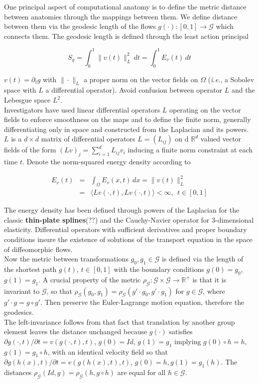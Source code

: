 \documentclass[final, paper=letter,5p,times,twocolumn]{elsarticle}
\newcommand{\CA}{computational anatomy}
\theoremstyle{definition}
\begin{document}
One principal aspect of \CA{} is to define the metric distance between anatomies through the mappings between them. We define distance between them via the geodesic length of the flows $g(\cdot): [0, 1] \rightarrow \mathcal{G}$ which connects them. The geodesic length is defined through the least action principal 

$$
S_{g} = \int_{0}^{1} \|v(t)\|_{L}^{2} \,dt = \int_{0}^{1} E_{v}(t) \,dt
$$ 

$v(t) = \partial_{t} g$ with $\| \cdot \|_{L}$ a proper norm on the vector fields on $\Omega$ ({\it i.e.}, a Sobolev space with $L$ a differential operator). Avoid confusion between operator $L$ and the Lebesgue space $L^{2}$.\\

Investigators have used linear differential operators $L$ operating on the vector fields to enforce smoothness on the maps and to define the finite norm, generally differentiating only in space and constructed from the Laplacian and its powers. $L$ is a $d \times d$ matrix of differential operators $L = (L_{ij})$ on d $\mathbb{R}^{d}$ valued vector fields of the form $(Lv)_{j} = \sum_{i = 1}^{d} L_{ij}v_{i}$ inducing a finite norm constraint at each time $t$. Denote the norm-squared energy density according to 

\begin{eqnarray*}
  E_{v}(t) & = & \int_{\Omega}E_{v}(x,t) \, dx = \| v(t)\|_{L}^{2} \\
  & = & \langle Lv(\cdot, t), Lv(\cdot, t) \rangle < \infty, ~~t \in [0,1]
\label{EnergyDensity}
\end{eqnarray*}

The energy density has been defined through powers of the Laplacian for the classic {\bf thin-plate splines}(??) and the Cauchy-Navier operator for 3-dimensional elasticity. Differential operators with sufficient derivatives and proper boundary conditions insure the existence of solutions of the transport equation in the space of diffeomorphic flows.\\

Now the metric between transformations $g_{0}, g_{1} \in \mathcal{G}$ is defined via the length of the shortest path $g(t)$, $t \in [0, 1]$ with the boundary conditions $g(0) = g_{0}$, $g(1) = g_{1}$. A crucial property of the metric $\rho_{\mathcal{G}}: \mathcal{G} \times \mathcal{G} \rightarrow \mathbb{R}^{+}$ is that it is invariant to $\mathcal{G}$, so that $\rho_{\mathcal{G}}(g_{0}, g_{1}) = \rho_{\mathcal{G}}(g' \cdot g_{0}, g' \cdot g_{1})$ for $g \in \mathcal{G}$, where $g' \cdot g = g \circ g'$. Then preserve the Euler-Lagrange motion equation, therefore the geodesics.\\
The left-invariance follows from that fact that translation by another group element leaves the distance unchanged because $g(\cdot)$ satisfies $\partial g(\cdot, t) / \partial t = v(g(\cdot, t), t)$, $g(0) = Id$, $g(1) = g_{1}$ implying $g(0) \circ h = h$, $g(1) = g_{1} \circ h$, with an identical velocity field so that $\partial g(h(x),t)/\partial t = v(g(h(x),t),t)$, $g(0) = h, g(1) = g_{1}(h)$. The distances $\rho_{\mathcal{G}}(Id, g) = \rho_{\mathcal{G}}(h, g \circ h)$ are equal for all $h \in \mathcal{G}$.
\end{document}

